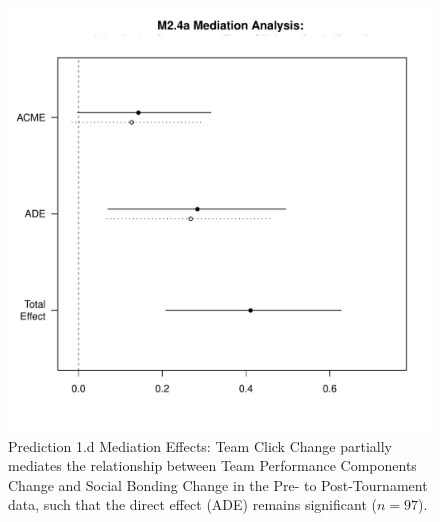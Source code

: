 \begin{CJK}{UTF8}{gbsn}
  \begin{figure}[htbp]
    \centering
    \includegraphics[scale=.5]{images/MLM24aMediationAnalysisOffline1.pdf}
    \caption{Prediction 1.d Mediation Effects: Team Click Change partially mediates the relationship between Team Performance Components Change and Social Bonding Change in the Pre- to Post-Tournament data, such that the direct effect (ADE) remains significant ($n = 97$).}
    \label{fig:MLM24aMediationAnalysis}
  \end{figure}






















\end{CJK}
